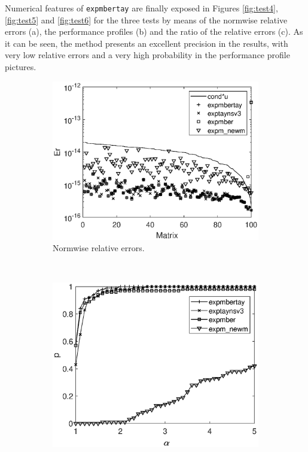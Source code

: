 \documentclass[preprint,10pt,numbers,sort&compress]{elsarticle}
\begin{document}
Numerical features of \texttt{expmbertay} are finally exposed in Figures \ref{fig:test4}, \ref{fig:test5} and \ref{fig:test6} for the three tests by means of the normwise relative errors (a), the performance profiles (b) and the ratio of the relative errors (c). As it can be seen, the method presents an excellent precision in the results, with very low relative errors and a very high probability in the performance profile pictures.
\begin{figure}[t]
\centering
\begin{subfigure}[b]{0.48\textwidth}
\includegraphics[scale=0.44]{Figures/normwise_exp_diag_hadamard_complex_n128_nd256_expmbertay.eps}
\caption{\footnotesize Normwise relative errors.} \label{fig:test4_a} \vspace{12pt}
\end{subfigure} \ \
\begin{subfigure}[b]{0.48\textwidth}
\includegraphics[scale=0.44]{Figures/nprofile_exp_diag_hadamard_complex_n128_nd256_expmbertay.eps}

\end{subfigure}
\end{figure}
\end{document}
